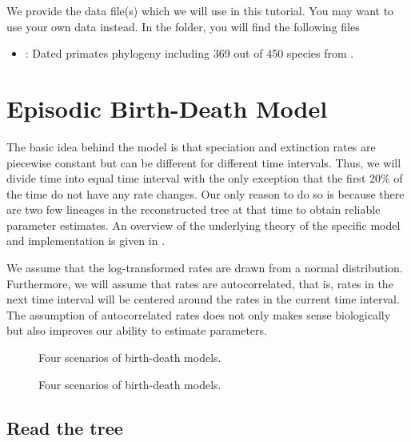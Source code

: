 We provide the data file(s) which we will use in this tutorial.
You may want to use your own data instead.
In the  folder, you will find the following files
\begin{itemize}
\item {}: Dated primates phylogeny including 369 out of 450 species from \cite{Springer2012}.
\end{itemize}




\bigskip
\section{Episodic Birth-Death Model}

The basic idea behind the model is that speciation and extinction rates are piecewise constant but can be different for different time intervals.
Thus, we will divide time into equal time interval with the only exception that the first 20\% of the time do not have any rate changes.
Our only reason to do so is because there are two few lineages in the reconstructed tree at that time to obtain reliable parameter estimates.
An overview of the underlying theory of the specific model and implementation is given in \citep{Hoehna2015a}.

We assume that the log-transformed rates are drawn from a normal distribution.
Furthermore, we will assume that rates are autocorrelated, that is, rates in the next time interval will be centered around the rates in the current time interval.
The assumption of autocorrelated rates does not only makes sense biologically but also improves our ability to estimate parameters.
\begin{figure}[h!]
\centering
{}
\caption{\small Four scenarios of birth-death models.}
\label{fig:EBD}
\end{figure}

\begin{figure}[h!]
\centering
{}
\caption{\small Four scenarios of birth-death models.}
\label{fig:EBD}
\end{figure}



\subsection{Read the tree}

